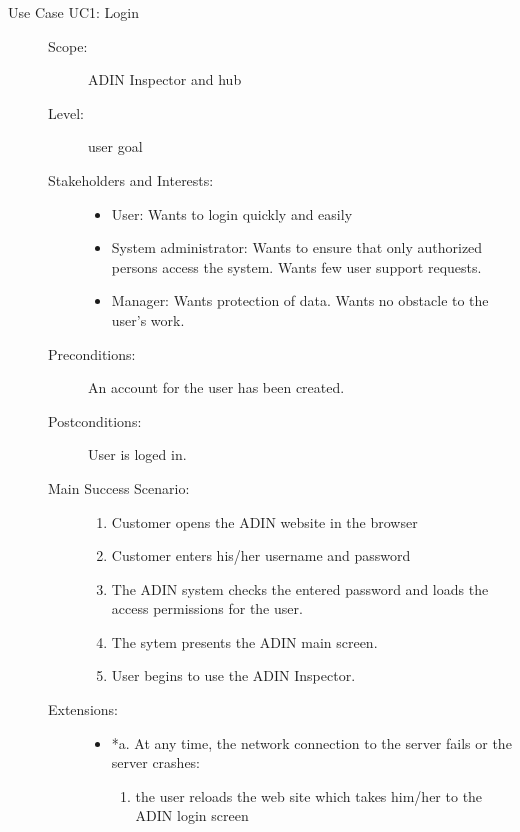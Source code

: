 \documentclass[twoside, english, draft]{Pflichtenheft}
\begin{document}
\begin{description}
	\item[Use Case UC1: Login]
	      \hfill
	      \begin{description}
		      \item[Scope:] ADIN Inspector and hub
		      \item[Level:] user goal
		      \item[Stakeholders and Interests:]
		            \hfill
		            \begin{itemize}
			            \item{User: Wants to login quickly and easily}
			            \item{System administrator: Wants to ensure that only authorized persons access the system. Wants few user support requests.}
			            \item{Manager: Wants protection of data. Wants no obstacle to the user's work.}
		            \end{itemize}
		      \item[Preconditions:] An account for the user has been created.
		      \item[Postconditions:] User is loged in.
		      \item[Main Success Scenario:]
		            \hfill
		            \begin{enumerate}
			            \item{Customer opens the ADIN website in the browser}
			            \item{Customer enters his/her username and password}
			            \item{The ADIN system checks the entered password and loads the access permissions for the user.}
			            \item{The sytem presents the ADIN main screen.}
			            \item{User begins to use the ADIN Inspector.}
		            \end{enumerate}

		      \item[Extensions:]
		            \hfill
		            \begin{itemize}
			            \item[]*a. At any time, the network connection to the server fails or the server crashes:
			                  \begin{enumerate}
				                  \item{the user reloads the web site which takes him/her to the ADIN login screen}
			                  \end{enumerate}


\end{itemize}
\end{description}
\end{description}
\end{document}
